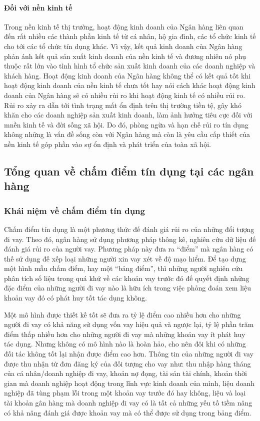\paragraph{Đối với nền kinh tế}
Trong nền kinh tế thị trường, hoạt động kinh doanh của Ngân hàng liên quan đến rất nhiều các thành phần kinh tế từ cá nhân, hộ gia đình, các tổ chức kinh tế cho tới các tổ chức tín dụng khác. Vì vậy, kết quả kinh doanh của Ngân hàng phản ánh kết quả sản xuất kinh doanh của nền kinh tế và đương nhiên nó phụ thuộc rất lớn vào tình hình tổ chức sản xuất kinh doanh của các doanh nghiệp và khách hàng. Hoạt động kinh doanh của Ngân hàng không thể có kết quả tốt khi hoạt động kinh doanh của nền kinh tế chưa tốt hay nói cách khác hoạt động kinh doanh của Ngân hàng sẽ có nhiều rủi ro khi hoạt động kinh tế có nhiều rủi ro. Rủi ro xảy ra dẫn tới tình trạng mất ổn định trên thị trường tiền tệ, gây khó khăn cho các doanh nghiệp sản xuất kinh doanh, làm ảnh hưởng tiêu cực đối với mnền kinh tế và đời sống xã hội. Do đó, phòng ngừa và hạn chế rủi ro tín dụng không những là vấn đề sống còn với Ngân hàng mà còn là yêu cầu cấp thiết của nền kinh tế góp phần vào sự ổn định và phát triển của toàn xã hội.



\subsection{Tổng quan về chấm điểm tín dụng tại các ngân hàng}
\subsubsection{Khái niệm về chấm điểm tín dụng}
Chấm điểm tín dụng là một phương thức đế đánh giá rủi ro của những đổi tượng đi vay. 
Theo đó, ngân hàng sử dụng phương pháp thông kê, nghiên cứu dữ liệu đế đánh giá rủi ro của người vay. 
Phương pháp này đưa ra “điểm” mà ngân hàng có thế sử dụng đế xếp loại những người xin vay xét về độ mạo hiểm. Để tạo dựng một hình mẫu chấm điểm, hay một “bảng điểm”, thì những người nghiên cứu phân tích số liệu trong quá khứ về các khoản vay trước đó đế quyết định những đặc điểm của những người đi vay nào là hữu ích trong việc phỏng đoán xem liệu khoản vay đó có phát huy tốt tác dụng không.

Một mô hình được thiết kế tốt sẽ đưa ra tỷ lệ điểm cao nhiều hơn cho những người đi vay có khả năng sử dụng vốn vay hiệu quả và ngược lại, tỷ lệ phần trăm điểm thấp nhiều hơn cho những người đi vay mà những khoản vay ít phát huy tác dụng. Nhưng không có mô hình nào là hoàn hảo, cho nên đôi khi có những đối tác không tốt lại nhận được điểm cao hơn.
Thông tin của những người đi vay được thu nhận từ đơn đăng ký của đối tượng cho vay như: thu nhập hàng tháng của cá nhân/doanh nghiệp đi vay, khoản nợ đọng, tài sản tài chính, khoản thời gian mà doanh nghiệp hoạt động trong lĩnh vực kinh doanh của mình, liệu doanh nghiệp đã tùng phạm lỗi trong một khoản vay trước đó hay không, liệu và loại tài khoản gân hàng mà doanh nghiệp đi vay có là tất cả những yếu tố tiềm năng có khả năng đánh giá được khoản vay mà có thể được sử dụng trong bảng điểm.

